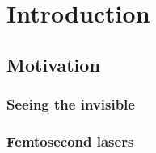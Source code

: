  \chapter{Introduction}
\label{ch:intro}

\section{Motivation}
\label{sec:introMotivation}
\subsection{Seeing the invisible}
\lipsum[3] \cite{Turing1952} \lipsum[1-3]




\subsection{Femtosecond lasers}
\lipsum[66]





